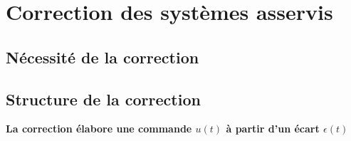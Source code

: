 \chapter{Correction des systèmes asservis\label{chap-correc}}
\minitoc
\newpage
\section{Nécessité de la correction}

\section{Structure de la correction}
\textbf{La correction élabore une commande $u(t)$ à partir d'un écart 
$\epsilon(t)$}


\begin{center}
    
\end{center}



